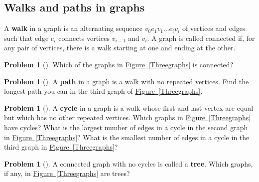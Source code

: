 \documentclass[10pt,]{book}
\newcommand{\terminology}[1]{\textbf{#1}}
\theoremstyle{plain}
\theoremstyle{definition}
\newtheorem{activity}[project]{Problem}
\theoremstyle{definition}
\numberwithin{equation}{chapter}
\begin{document}
\subsection[{Walks and paths in graphs}]{Walks and paths in graphs}\label{subsection-22}
A \terminology{walk} in a graph is an alternating sequence \(v_0e_1v_1\ldots
e_iv_i\) of vertices and edges such that edge \(e_i\) connects vertices \(v_{i-1}\) and \(v_i\). A graph is called connected if, for any pair of vertices, there is a walk starting at one and ending at the other.%
\begin{activity}[]\marginsymbol[-1em]{} \label{connectedanddisconnected}
Which of the graphs in \hyperref[Threegraphs]{Figure~\ref{Threegraphs}} is connected?%
\end{activity}
\begin{activity}[] \label{activity-105}
A \terminology{path} in a graph is a walk with no repeated vertices.  Find the longest path you can in the third graph of \hyperref[Threegraphs]{Figure~\ref{Threegraphs}}.%
\end{activity}
\begin{activity}[] \label{activity-106}
A \terminology{cycle} in a graph is a walk whose first and last vertex are equal but which has no other repeated vertices.  Which graphs in \hyperref[Threegraphs]{Figure~\ref{Threegraphs}} have cycles?  What is the largest number of edges in a cycle in the second graph in \hyperref[Threegraphs]{Figure~\ref{Threegraphs}}?  What is the smallest number of edges in a cycle in the third graph in \hyperref[Threegraphs]{Figure~\ref{Threegraphs}}?%
\end{activity}
\begin{activity}[] \label{activity-107}
A connected graph with no cycles is called a \terminology{tree}.  Which graphs, if any, in \hyperref[Threegraphs]{Figure~\ref{Threegraphs}} are trees?%
\end{activity}
\typeout{************************************************}
\typeout{************************************************}
\end{document}
